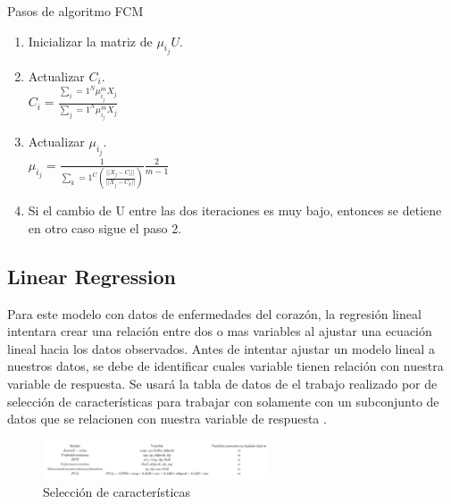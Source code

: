 \documentclass[10pt,journal]{IEEEtran}
\begin{document}
Pasos de algoritmo FCM
\begin{enumerate}
  \item Inicializar la matriz de \begin{math}\mu_{i_j} U\end{math}. \\
  \item Actualizar \begin{math} C_i \end{math}. \\
        \begin{math}C_i = \frac{\sum_i=1^N  \mu_{i_j}^m X_j} { \sum_j=1^N  \mu_{i_j}^m X_j} \end{math}
  
  \item Actualizar \begin{math}\mu_{i_j} \end{math}. \\
         \begin{math}\mu_{i_j} = \frac{1} {\sum_k=1^C ( \frac{\vert \vert X_j - C_i \vert\vert }{\vert \vert X_j - C_k \vert\vert} )} \frac{2}{m-1}\end{math} \\
  \item Si el cambio de U entre las dos iteraciones es muy bajo, entonces se detiene en otro caso sigue el paso 2.       
         
\end{enumerate}

\subsection{Linear Regression}

Para este modelo con datos de enfermedades del corazón, la regresión lineal intentara crear una relación entre dos o mas variables al ajustar una ecuación lineal hacia los datos observados. 
Antes de intentar ajustar un modelo lineal a nuestros datos, se debe de identificar cuales variable tienen relación con nuestra variable de respuesta.
Se usará la tabla de datos de el trabajo realizado \cite{emmanuelramosFeatureSelection} por de selección de características para trabajar con solamente con un subconjunto de datos que se relacionen con nuestra variable de respuesta .

\begin{figure}[ht]
    \centering
    \includegraphics[width=0.60\textwidth]{feature_selection_cap4.png}
    \caption{Selección de características} 
    \label{fig:feature_selec}
\end{figure}
\end{document}
